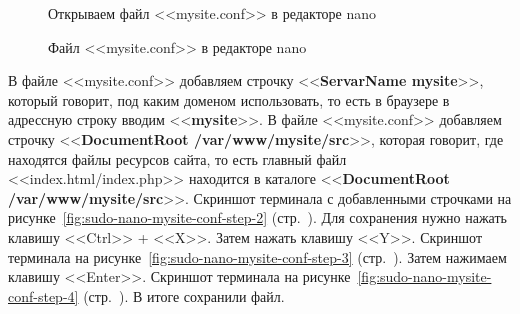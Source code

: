 \begin{figure}[p]
    \caption{Открываем файл <<mysite.conf>> в редакторе nano}
    \label{fig:sudo-nano-mysite-conf}
\end{figure}

\begin{figure}[p]
    \caption{Файл <<mysite.conf>> в редакторе nano}
    \label{fig:sudo-nano-mysite-conf-step-1}
\end{figure}

В файле <<mysite.conf>> добавляем строчку <<\textbf{ServarName mysite}>>, который говорит, под каким доменом использовать, то есть в браузере в адрессную строку вводим <<\textbf{mysite}>>. В файле <<mysite.conf>> добавляем строчку <<\textbf{DocumentRoot /var/www/mysite/src}>>, которая говорит, где находятся файлы ресурсов сайта, то есть главный файл <<index.html/index.php>> находится в каталоге <<\textbf{DocumentRoot /var/www/mysite/src}>>.
Скриншот терминала с добавленными строчками на рисунке~\ref{fig:sudo-nano-mysite-conf-step-2} (стр.~\pageref{fig:sudo-nano-mysite-conf-step-2}).
Для сохранения нужно нажать клавишу <<Ctrl>> + <<X>>. Затем нажать клавишу <<Y>>.
Скриншот терминала на рисунке~\ref{fig:sudo-nano-mysite-conf-step-3} (стр.~\pageref{fig:sudo-nano-mysite-conf-step-3}).
Затем нажимаем клавишу <<Enter>>.
Скриншот терминала на рисунке~\ref{fig:sudo-nano-mysite-conf-step-4} (стр.~\pageref{fig:sudo-nano-mysite-conf-step-4}).
В итоге сохранили файл.

